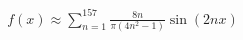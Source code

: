 \documentclass[preview]{standalone}
\begin{document}
\begin{align*}
f(x) \approx \sum_{n=1}^{157} \frac{8n}{\pi(4n^2-1)} \sin(2nx)
\end{align*}
\end{document}

